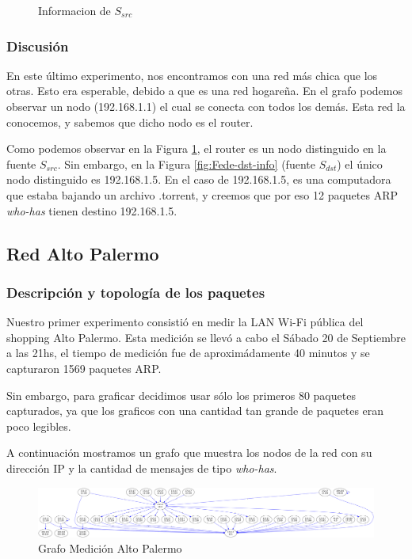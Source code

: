 \documentclass[10pt, a4paper]{article}
\begin{document}
\begin{figure}[H]
\begin{minipage}{0.5\linewidth}
    \caption{Informacion de $S_{src}$}\label{fig:Fede-src-info}
  \end{minipage}
\end{figure}

\subsubsection{Discusión}

En este último experimento, nos encontramos con una red más chica que los otras. Esto era esperable, debido a que es una red hogareña. En el grafo podemos observar un nodo (192.168.1.1) el cual se conecta con todos los demás. Esta red la conocemos, y sabemos que dicho nodo es el router.

Como podemos observar en la Figura \ref{fig:Fede-src-info}, el router es un nodo distinguido en la fuente $S_{src}$. Sin embargo, en la Figura \ref{fig:Fede-dst-info} (fuente $S_{dst}$) el único nodo distinguido es 192.168.1.5. En el caso de 192.168.1.5, es una computadora que estaba bajando un archivo .torrent, y creemos que por eso 12 paquetes ARP \emph{who-has} tienen destino 192.168.1.5.

\subsection{Red Alto Palermo}

\subsubsection{Descripción y topología de los paquetes}

Nuestro primer experimento consistió en medir la LAN Wi-Fi pública del shopping Alto Palermo. Esta medición se llevó a cabo el Sábado 20 de Septiembre a las 21hs, el tiempo de medición fue de aproximádamente 40 minutos y se capturaron 1569 paquetes ARP.

Sin embargo, para graficar decidimos usar sólo los primeros 80 paquetes capturados, ya que los graficos con una cantidad tan grande de paquetes eran poco legibles.

A continuación mostramos un grafo que muestra los nodos de la red con su dirección IP y la cantidad de mensajes de tipo \emph{who-has}.

\begin{figure}[H]
 \begin{center}
  \includegraphics[width=\linewidth]{../imgs/snifAlto-ips_red.png}
  \caption{Grafo Medición Alto Palermo}
 \end{center}

\end{figure}
\end{document}
